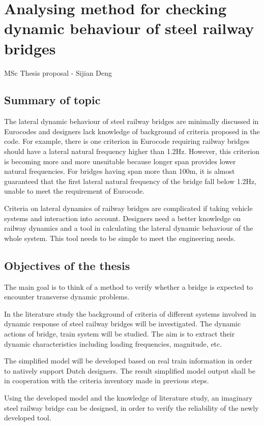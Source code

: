 \documentclass{report}
\begin{document}
\chapter*{Analysing method for checking dynamic behaviour of steel railway bridges}

MSc Thesis proposal - Sijian Deng


\section*{Summary of topic}

The lateral dynamic behaviour of steel railway bridges are minimally discussed in Eurocodes and designers lack knowledge of background of criteria proposed in the code. For example, there is one criterion in Eurocode requiring railway bridges should have a lateral natural frequency higher than 1.2Hz. However, this criterion is becoming more and more unsuitable because longer span provides lower natural frequencies. For bridges having span more than 100m, it is almost guaranteed that the first lateral natural frequency of the bridge fall below 1.2Hz, unable to meet the requirement of Eurocode. 

Criteria on lateral dynamics of railway bridges are complicated if taking vehicle systems and interaction into account. Designers need a better knowledge on railway dynamics and a tool in calculating the lateral dynamic behaviour of the whole system. This tool needs to be simple to meet the engineering needs.  

\section*{Objectives of the thesis}
The main goal is to think of a method to verify whether a bridge is expected to encounter transverse dynamic problems. 

In the literature study the background of criteria of different systems involved in dynamic response of steel railway bridges will be investigated. The dynamic actions of bridge, train system will be studied. The aim is to extract their dynamic characteristics including loading frequencies, magnitude, etc.

The simplified model will be developed based on real train information in order to natively support Dutch designers. The result simplified model output shall be in cooperation with the criteria inventory made in previous steps.

Using the developed model and the knowledge of literature study, an imaginary steel railway bridge can be designed, in order to verify the reliability of the newly developed tool. 
\end{document}
